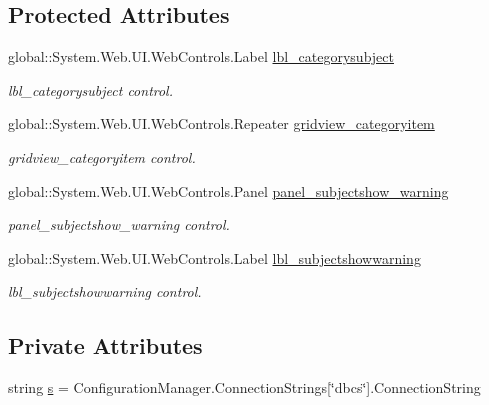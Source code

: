 \subsection*{Protected Attributes}
\begin{DoxyCompactItemize}
\item 
global\+::\+System.\+Web.\+U\+I.\+Web\+Controls.\+Label \mbox{\hyperlink{classcategoryitem_ab8f9bf9ea5c9fd96945dfc0e54f4ccfd}{lbl\+\_\+categorysubject}}
\begin{DoxyCompactList}\small\item\em lbl\+\_\+categorysubject control. \end{DoxyCompactList}\item 
global\+::\+System.\+Web.\+U\+I.\+Web\+Controls.\+Repeater \mbox{\hyperlink{classcategoryitem_aaf845f0bee4a6951cfd3fd3c29bdc12b}{gridview\+\_\+categoryitem}}
\begin{DoxyCompactList}\small\item\em gridview\+\_\+categoryitem control. \end{DoxyCompactList}\item 
global\+::\+System.\+Web.\+U\+I.\+Web\+Controls.\+Panel \mbox{\hyperlink{classcategoryitem_a635ebf5d186919af0716316b82d559d5}{panel\+\_\+subjectshow\+\_\+warning}}
\begin{DoxyCompactList}\small\item\em panel\+\_\+subjectshow\+\_\+warning control. \end{DoxyCompactList}\item 
global\+::\+System.\+Web.\+U\+I.\+Web\+Controls.\+Label \mbox{\hyperlink{classcategoryitem_a878b0b43778ad25d87c040e19bd47f73}{lbl\+\_\+subjectshowwarning}}
\begin{DoxyCompactList}\small\item\em lbl\+\_\+subjectshowwarning control. \end{DoxyCompactList}\end{DoxyCompactItemize}
\subsection*{Private Attributes}
\begin{DoxyCompactItemize}
\item 
string \mbox{\hyperlink{classcategoryitem_a05d1b5370e49dd0bc3099c75aa96fa2c}{s}} = Configuration\+Manager.\+Connection\+Strings\mbox{[}\char`\"{}dbcs\char`\"{}\mbox{]}.Connection\+String
\end{DoxyCompactItemize}


